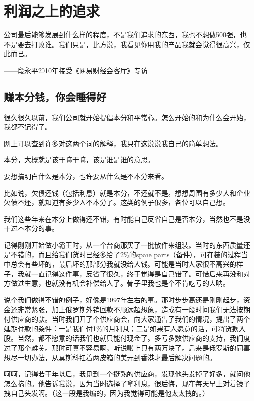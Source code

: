 
\section{利润之上的追求}

公司最后能够发展到什么样的程度，不是我们追求的东西，我也不想做500强，也不是要去打败谁。我们只是，比方说，我看见你用我的产品我就会觉得很高兴，仅此而已。

——段永平2010年接受《网易财经会客厅》专访

\subsection{赚本分钱，你会睡得好}

很久很久以前，我们公司就开始提倡本分和平常心。怎么开始的和为什么会开始，我都不记得了。

网上可以查到许多对这两个词的解释，我只在这说说我自己的简单想法。

本分，大概就是该干嘛干嘛，该是谁是谁的意思。

要想搞明白什么是本分，也许要从什么是不本分来看。

比如说，欠债还钱（包括利息）就是本分，不还就不是。想想周围有多少人和企业欠债不还，就知道有多少人不本分了。这类的例子很多，各位可以自己想。

我们这些年来在本分上做得还不错，有时能自己反省自己是否本分，当然也不是没干过不本分的事。

记得刚刚开始做小霸王时，从一个台商那买了一批散件来组装。当时的东西质量还是不错的，而且给我们货时已经多给了2\%的spare parts（备件），可在装的过程当中总会有些坏的，最后坏的那部分我就没给人钱。可能是当时人家很不高兴的样子，我就一直记得这件事，反省了很久，终于觉得是自己错了。可惜后来再没和对方做过生意，也就没有机会补偿给人了。骨子里我也是个不肯吃亏的人呐。

说个我们做得不错的例子，好像是1997年左右的事。那时步步高还是刚刚起步，资金还非常紧张，加上俄罗斯外销回款不顺远超想象，造成有一段时间我们无法按期付供应商的款。当时我们开了个供应商会，向大家通告了我们的情况，提出了两个延期付款的条件：一是我们付1\%的月利息；二是如果有人愿意的话，可将货款入股。当然，都不愿意的话我们也就只能付现金了。多亏多数供应商的支持，我们度过了那个难关。那时可真不容易啊，听说账上只有两万块了。后来是俄罗斯的同事想尽一切办法，从莫斯科扛着两皮箱的美元到香港才最后解决问题的。

呵呵，记得若干年以后，我见到一个挺熟的供应商，发现他头发掉了好多，就问他怎么搞的。他告诉我说，因为当时选择了拿利息，很后悔，现在每天早上对着镜子拽自己头发啊。（这一段是我编的，因为我觉得可能是他太太拽的。）

